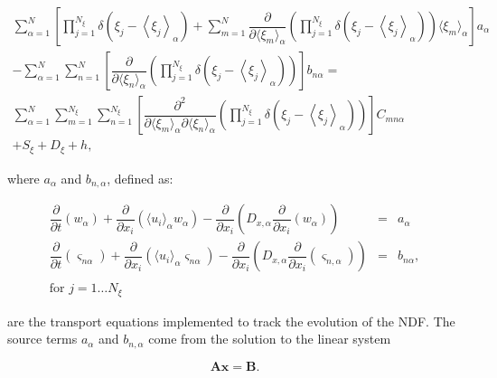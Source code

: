 \begin{multline}\label{eq:quadrature-approximated-moment-xport-eqn}
{\displaystyle {\displaystyle \sum_{\alpha=1}^{N}\left[
{\displaystyle \prod_{j=1}^{N_{\xi}}}\delta\left(\xi_{j}-\left\langle \xi_{j}\right\rangle _{\alpha}\right)
+\sum_{m=1}^{N}\dfrac{\partial}{\partial\langle\xi_{m}\rangle_{\alpha}}\left(\prod_{j=1}^{N_{\xi}}
\delta\left(\xi_{j}-\left\langle \xi_{j}\right\rangle _{\alpha}\right)
\right)\langle\xi_{m}\rangle_{\alpha}\right]}a_{\alpha}} \\
-\sum_{\alpha=1}^{N}\sum_{n=1}^{N}\left[\dfrac{\partial}{\partial\langle\xi_{n}\rangle_{\alpha}}\left(\prod_{j=1}^{N_{\xi}}
\delta\left(\xi_{j}-\left\langle \xi_{j}\right\rangle _{\alpha}\right)
\right)\right]b_{n\alpha}= \\
{\displaystyle \sum_{\alpha=1}^{N}\sum_{m=1}^{N_{\xi}}\sum_{n=1}^{N_{\xi}}}\left[\dfrac{\partial^{2}}{\partial\langle\xi_{m}\rangle_{\alpha}\partial\langle\xi_{n}\rangle_{\alpha}}\left({\displaystyle \prod_{j=1}^{N_{\xi}}
\delta\left(\xi_{j}-\left\langle \xi_{j}\right\rangle _{\alpha}\right)
}\right)\right]C_{mn\alpha} \\
+S_{\xi}+D_{\xi}+h,
\end{multline}

\noindent where $a_{\alpha}$ and $b_{n,\alpha}$, defined as:

\begin{eqnarray}\label{eq:a-b-transport-eqns}
\dfrac{\partial}{\partial t}\left( w_{\alpha} \right)
+\dfrac{\partial}{\partial x_{i}}\left( \langle u_{i}\rangle_{\alpha}w_{\alpha} \right)
-\dfrac{\partial}{\partial x_{i}} \left( D_{x,\alpha} \dfrac{\partial}{\partial x_{i}} \left( w_{\alpha} \right) \right)
&=&a_{\alpha} \\
\dfrac{\partial}{\partial t}\left( \varsigma_{n\alpha} \right)
+\dfrac{\partial}{\partial x_{i}}\left( \langle u_{i}\rangle_{\alpha}\varsigma_{n\alpha} \right) 
-\dfrac{\partial}{\partial x_{i}}\left( D_{x,\alpha} \dfrac{\partial}{\partial x_{i}} \left( \varsigma_{n,\alpha} \right) \right) 
&=&b_{n\alpha}, \\
&&\nonumber \\ 
\text{for }j=1\dots N_{\xi} & & \nonumber
\end{eqnarray}

\noindent are the transport equations implemented to track the evolution of the NDF.  The source terms $a_{\alpha}$ and $b_{n,\alpha}$ come from the solution to the linear system

\begin{equation}\label{eq:Ax=B}
\mathbf{Ax} = \mathbf{B}.
\end{equation}

